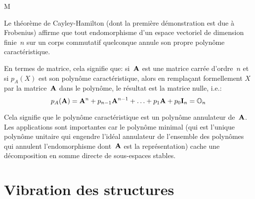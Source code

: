 M\medskip
{}
\begin{remarque}
Le théorème de Cayley-Hamilton (dont la première démonstration est due à Frobenius) affirme que tout endomorphisme d'un espace vectoriel de dimension finie~$n$ sur un corps commutatif quelconque annule son propre polynôme caractéristique.

En termes de matrice, cela signifie que: si~$\MM{A}$ est une matrice carrée d'ordre~$n$ et si $p_A(X)$ est son polynôme caractéristique, alors en remplaçant formellement $X$ par la matrice~$\MM{A}$ dans le polynôme, le résultat est la matrice nulle, i.e.:
\begin{equation}p_A(\MM{A})= \MM{A}^n + p_{n-1}\MM{A}^{n-1} + \ldots + p_1 \MM{A} + p_0 \MM{I}_n = \MM{\mO}_n \end{equation}

Cela signifie que le polynôme caractéristique est un
polynôme annulateur de~$\MM{A}$. Les applications sont importantes car le polynôme minimal (qui est l'unique polynôme unitaire qui engendre l'idéal annulateur de l'ensemble des polynômes qui annulent l'endomorphisme dont~$\MM{A}$ est la représentation) cache une décomposition en somme directe de sous-espaces stables.
\end{remarque}








\medskip
\section{Vibration des structures}

